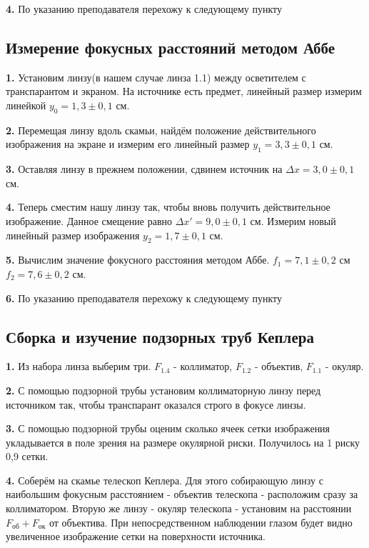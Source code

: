 \documentclass[a4paper,12pt]{article}
\begin{document}
\textbf{4.} По указанию преподавателя перехожу к следующему пункту

\subsection*{Измерение фокусных расстояний методом Аббе}
\textbf{1.} Установим линзу(в нашем случае линза 1.1) между осветителем с транспарантом и экраном. На источнике есть предмет, линейный размер измерим линейкой $y_0 = 1,3 \pm 0,1$ см. 

\textbf{2.} Перемещая линзу вдоль скамьи, найдём положение действительного изображения на экране и измерим его линейный размер $y_1 =  3,3 \pm 0,1$ см.

\textbf{3.} Оставляя линзу в прежнем положении, сдвинем источник на $\Delta x = 3,0 \pm 0,1$ см. 

\textbf{4.} Теперь сместим нашу линзу так, чтобы вновь получить действительное изображение. Данное смещение равно $\Delta x' = 9,0 \pm 0,1$ см. Измерим новый линейный размер изображения $y_2 = 1,7 \pm 0,1$ см.

\textbf{5.} Вычислим значение фокусного расстояния методом Аббе. $f_1 = 7,1 \pm 0,2$ см $f_2 = 7,6 \pm 0,2$ см.

\textbf{6.} По указанию преподавателя перехожу к следующему пункту

\subsection*{Сборка и изучение подзорных труб Кеплера}
\textbf{1.} Из набора линза выберим три. $F_{1.4}$ - коллиматор, $F_{1.2}$ - объектив, $F_{1.1}$ - окуляр.

\textbf{2.} С помощью подзорной трубы установим коллиматорную линзу перед источником так, чтобы транспарант оказался строго в фокусе линзы.

\textbf{3.} С помощью подзорной трубы оценим сколько ячеек сетки изображения укладывается в поле зрения на размере окулярной риски. Получилось на 1 риску 0,9 сетки.

\textbf{4.} Соберём на скамье телескоп Кеплера. Для этого собирающую линзу с наибольшим фокусным расстоянием - объектив телескопа - расположим сразу за коллиматором. Вторую же линзу - окуляр телескопа - установим на расстоянии $F_\text{об} + F_\text{ок}$ от объектива. При непосредственном наблюдении глазом будет видно увеличенное изображение сетки на поверхности источника.
\end{document}
